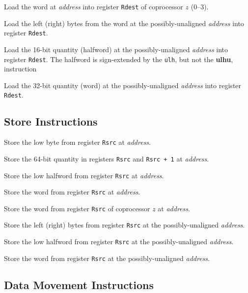 Load the word at {\em address\/} into register {\tt Rdest} of
coprocessor $z$ (0--3).

Load the left (right) bytes from the word at the possibly-unaligned
{\em address\/} into register {\tt Rdest}.

Load the 16-bit quantity (halfword) at the possibly-unaligned {\em
address\/} into register {\tt Rdest}.  The halfword is sign-extended
by the {\tt ulh}, but not the {\bf ulhu}, instruction

Load the 32-bit quantity (word) at the possibly-unaligned {\em
address\/}  into register {\tt Rdest}.


\subsection {Store Instructions}

Store the low byte from register {\tt Rsrc} at {\em address\/}.

Store the 64-bit quantity in registers {\tt Rsrc} and {\tt Rsrc
+ 1} at {\em address\/}.

Store the low halfword from register {\tt Rsrc} at {\em address\/}.

Store the word from register {\tt Rsrc} at {\em address\/}.

Store the word from register {\tt Rsrc} of coprocessor $z$ at
{\em address\/}.

Store the left (right) bytes from register {\tt Rsrc} at the
possibly-unaligned {\em address\/}.

Store the low halfword from register {\tt Rsrc} at the
possibly-unaligned {\em address\/}.

Store the word from register {\tt Rsrc} at the possibly-unaligned
{\em address\/}.


\subsection{Data Movement Instructions}

